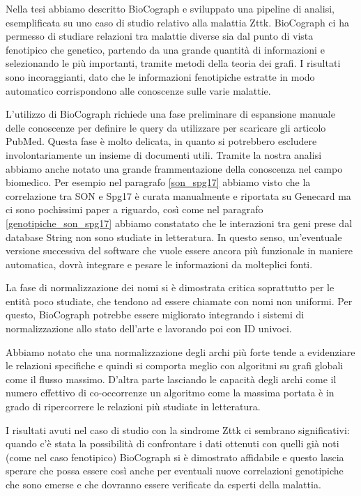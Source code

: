 \documentclass[12pt]{report}
\begin{document}
Nella tesi abbiamo descritto BioCograph e sviluppato una pipeline di analisi, esemplificata su uno caso di studio relativo alla malattia Zttk. BioCograph ci ha permesso di studiare relazioni tra malattie diverse sia dal punto di vista fenotipico che genetico, partendo da una grande quantità di informazioni e selezionando le più importanti, tramite metodi della teoria dei grafi. I risultati sono incoraggianti, dato che le informazioni fenotipiche estratte in modo automatico corrispondono alle conoscenze sulle varie malattie.


L'utilizzo di BioCograph richiede una fase preliminare di espansione manuale delle conoscenze per definire le query da utilizzare per scaricare gli articolo PubMed. Questa fase è molto delicata, in quanto si potrebbero escludere involontariamente un insieme di documenti utili. Tramite la nostra analisi abbiamo anche notato una grande frammentazione della conoscenza nel campo biomedico. Per esempio nel paragrafo \ref{son_spg17} abbiamo visto che la correlazione tra SON e Spg17 è curata manualmente e riportata su Genecard ma ci sono pochissimi paper a riguardo, così come nel paragrafo \ref{genotipiche_son_spg17} abbiamo constatato che le interazioni tra geni prese dal database String non sono studiate in letteratura. In questo senso, un'eventuale versione successiva del software che vuole essere ancora più funzionale in maniere automatica, dovrà integrare e pesare le informazioni da molteplici fonti.

La fase di normalizzazione dei nomi si è dimostrata critica soprattutto per le entità poco studiate, che tendono ad essere chiamate con nomi non uniformi. Per questo, BioCograph potrebbe essere migliorato integrando i sistemi di normalizzazione allo stato dell'arte e lavorando poi con ID univoci.

Abbiamo notato che una normalizzazione degli archi più forte tende a evidenziare le relazioni specifiche e quindi si comporta meglio con algoritmi su grafi globali come il flusso massimo. D'altra parte lasciando le capacità degli archi come il numero effettivo di co-occorrenze un algoritmo come la massima portata è in grado di ripercorrere le relazioni più studiate in letteratura.  

I risultati avuti nel caso di studio con la sindrome Zttk ci sembrano significativi: quando c'è stata la possibilità di confrontare i dati ottenuti con quelli già noti (come nel caso fenotipico) BioCograph si è dimostrato affidabile e questo lascia sperare che possa essere così anche per eventuali nuove correlazioni genotipiche che sono emerse e che dovranno essere verificate da esperti della malattia.  

\printbibliography %
\end{document}
